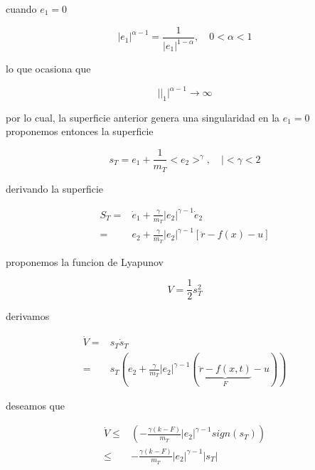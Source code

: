\newpage

\begin{flushright}
\end{flushright}

cuando $e_1=0$

\begin{equation*}
    |e_1|^{\alpha-1}=\frac{1}{|e_1|^{1-\alpha}},\quad 0<\alpha<1
\end{equation*}

lo que ocasiona que

\begin{equation*}
    ||_1|^{\alpha-1}\to \infty
\end{equation*}

por lo cual, la superficie anterior genera una singularidad en la $e_1=0$ proponemos entonces la superficie

\begin{equation*}
    s_T=e_1+\frac{1}{m_T}<e_2>^\gamma, \quad |<\gamma<2
\end{equation*}

derivando la superficie

\begin{equation*}
    \begin{aligned}
        S_T=&\dot{e}_1+\frac{\gamma}{m_T}|e_2|^{\gamma-1}\dot{e}_2\\
            =& e_2+\frac{\gamma}{m_T}|e_2|^{\gamma-1}[\ddot{r}-f(x)-u]
    \end{aligned}
\end{equation*}

proponemos la funcion de Lyapunov

\begin{equation*}
    V=\frac{1}{2}s_T^2
\end{equation*}

derivamos

\begin{equation*}
    \begin{aligned}
        \dot{V}=&s_T\dot{s}_T\\
            =&s_T(e_2+\frac{\gamma}{m_T}|e_2|^{\gamma-1}( \underbrace{\ddot{r}-f(x,t)}_F-u))
    \end{aligned}
\end{equation*}

deseamos que 

\begin{equation*}
    \begin{aligned}
        \dot{V}\leq & (-\frac{\gamma (k-F)}{m_T}|e_2|^{\gamma-1}sign(s_T))\\
            \leq & - \frac{\gamma (k-F)}{m_T} |e_2|^{\gamma-1}|s_T|
    \end{aligned}
\end{equation*}

